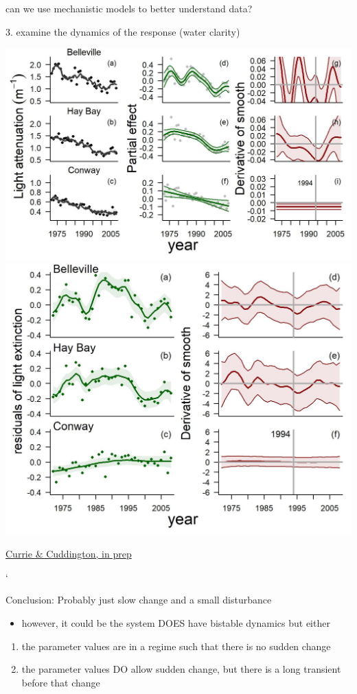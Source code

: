 \documentclass[
  ignorenonframetext,
]{beamer}
\providecommand{\tightlist}{%
  \setlength{\itemsep}{0pt}\setlength{\parskip}{0pt}}
\begin{document}
\begin{frame}{can we use mechanistic models to better understand data?}
\begin{block}{3. examine the dynamics of the response (water clarity)}
\begin{center}\includegraphics[width=0.7\linewidth]{lightgamApr11} \includegraphics[width=0.7\linewidth]{gamresidlightApr05} \end{center}

\href{}{Currie \& Cuddington, in prep}

`
\end{block}

\begin{block}{Conclusion: Probably just slow change and a small
disturbance}
\protect\hypertarget{conclusion-probably-just-slow-change-and-a-small-disturbance}{}
\begin{itemize}
\tightlist
\item
  however, it could be the system DOES have bistable dynamics but either
\end{itemize}

\begin{enumerate}
\tightlist
\item
  the parameter values are in a regime such that there is no sudden
  change
\item
  the parameter values DO allow sudden change, but there is a long
  transient before that change
\end{enumerate}


\end{block}
\end{frame}
\end{document}
